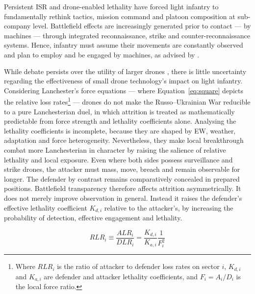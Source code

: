 Persistent ISR and drone-enabled lethality have forced light infantry to fundamentally rethink tactics, mission command and platoon composition at sub-company level. Battlefield effects are increasingly generated prior to contact --- by machines --- through integrated reconnaissance, strike and counter-reconnaissance systems. Hence, infantry must assume their movements are constantly observed and plan to employ and be engaged by machines, as advised by \textcite[58--63]{fm30}.

While debate persists over the utility of larger drones \parencite{calcara_2022a}, there is little uncertainty regarding the effectiveness of small drone technology's impact on light infantry. Considering Lanchester's force equations --- where Equation~\ref{eq:square} depicts the relative loss rates\footnote{Where \(RLR_i\) is the ratio of attacker to defender loss rates on sector \(i\), $K_{d,i}$ and $K_{a,i}$  are defender and attacker lethality coefficients, and \(F_i=A_i/D_i\) is the local force ratio.} \parencite{davis_1995,lanchester_1916,epstein_1988,hughes_1995a,MEARSHEIMER_1994} --- drones do not make the Russo--Ukrainian War reducible to a pure Lanchesterian duel, in which attrition is treated as mathematically predictable from force strength and lethality coefficients alone. Analysing the lethality coefficients is incomplete, because they are shaped by EW, weather, adaptation and force heterogeneity. Nevertheless, they make local breakthrough combat more Lanchesterian in character by raising the salience of relative lethality and local exposure. Even where both sides possess surveillance and strike drones, the attacker must mass, move, breach and remain observable for longer. The defender by contrast remains comparatively concealed in prepared positions. Battlefield transparency therefore affects attrition asymmetrically. It does not merely improve observation in general. Instead it raises the defender’s effective lethality coefficient $K_{d,i}$  relative to the attacker’s, by increasing the probability of detection, effective engagement and lethality.


\begin{equation}
	RLR_i \equiv \frac{ALR_i}{DLR_i} = \frac{K_{d,i}}{K_{a,i}} \frac{1}{F_i^{2}}
	\label{eq:square}
\end{equation}

